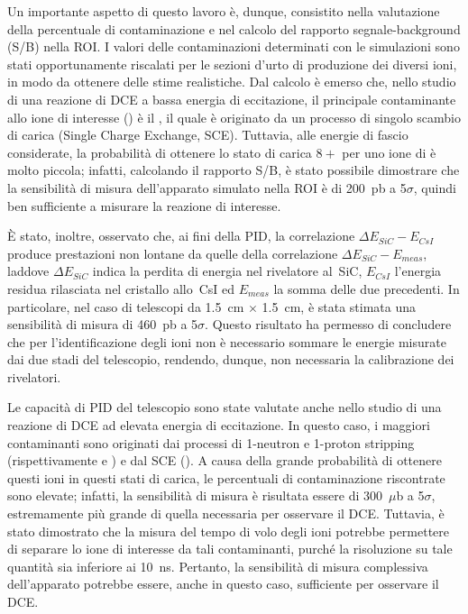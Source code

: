 Un importante aspetto di questo lavoro è, dunque, consistito nella valutazione della percentuale di contaminazione e nel calcolo del rapporto segnale-background (S/B) nella ROI. 
I valori delle contaminazioni determinati con le simulazioni sono stati opportunamente riscalati per le sezioni d'urto di produzione dei diversi ioni, in modo da ottenere delle stime realistiche.
Dal calcolo è emerso che, nello studio di una reazione di DCE a bassa energia di eccitazione, il principale contaminante allo ione di interesse () è il , il quale è originato da un processo di singolo scambio di carica (Single Charge Exchange, SCE). 
Tuttavia, alle energie di fascio considerate, la probabilità di ottenere lo stato di carica $8+$ per uno ione di  è molto piccola; infatti, calcolando il rapporto S/B, è stato possibile dimostrare che la sensibilità di misura dell'apparato simulato nella ROI è di 200~pb a 5$\sigma$, quindi ben sufficiente a misurare la reazione di interesse.


È stato, inoltre, osservato che, ai fini della PID, la correlazione $\Delta E_{SiC} - E_{CsI}$ produce prestazioni non lontane da quelle della correlazione $\Delta E_{SiC} - E_{meas}$, laddove $\Delta E_{SiC}$ indica la perdita di energia nel rivelatore al~SiC, $E_{CsI}$ l'energia residua rilasciata nel cristallo allo~CsI ed $E_{meas}$ la somma delle due precedenti.
In particolare, nel caso di telescopi da 1.5~cm $\times$ 1.5~cm, è stata stimata una sensibilità di misura di 460~pb a 5$\sigma$.
Questo risultato ha permesso di concludere che per l'identificazione degli ioni non è necessario sommare le energie misurate dai due stadi del telescopio, rendendo, dunque, non necessaria la calibrazione dei rivelatori.

Le capacità di PID del telescopio sono state valutate anche nello studio di una reazione di DCE ad elevata energia di eccitazione.
In questo caso, i maggiori contaminanti sono originati dai processi di 1-neutron e 1-proton stripping (rispettivamente  e ) e dal SCE ().
A causa della grande probabilità di ottenere questi ioni in questi stati di carica, le percentuali di contaminazione riscontrate sono elevate; infatti, la sensibilità di misura è risultata essere di 300~$\mu$b a 5$\sigma$, estremamente più grande di quella necessaria per osservare il DCE.
Tuttavia, è stato dimostrato che la misura del tempo di volo degli ioni potrebbe permettere di separare lo ione di interesse da tali contaminanti, purché la risoluzione su tale quantità sia inferiore ai 10~ns.
Pertanto, la sensibilità di misura complessiva dell'apparato potrebbe essere, anche in questo caso, sufficiente per osservare il DCE.


